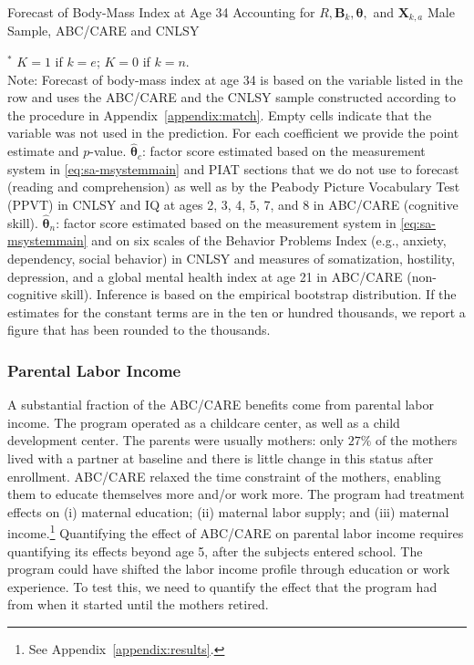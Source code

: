 \begin{table}
\begin{threeparttable}
\caption{Forecast of Body-Mass Index at Age 34 Accounting for $R, \bm{B}_k, \bm{\theta},$ and $\bm{X}_{k,a}$ Male Sample, ABC/CARE and CNLSY}
\label{table:invfin}
\centering
\scriptsize

\begin{tablenotes}
\footnotesize
\item $^\ast$ $K=1$ if $k=e$; $K=0$ if $k=n$.\\
Note: Forecast of body-mass index at age 34 is based on the variable listed in the row and uses the ABC/CARE and the CNLSY sample constructed according to the procedure in Appendix~\ref{appendix:match}. Empty cells indicate that the variable was not used in the prediction. For each coefficient we provide the point estimate and $p$-value. $\hat{\bm{\theta}}_{c}$: factor score estimated based on the measurement system in \eqref{eq:sa-msystemmain} and PIAT sections that we do not use to forecast (reading and comprehension) as well as by the Peabody Picture Vocabulary Test (PPVT) in CNLSY and IQ at ages 2, 3, 4, 5, 7, and 8 in ABC/CARE (cognitive skill). $\hat{\bm{\theta}}_{n}$: factor score estimated based on the measurement system in \eqref{eq:sa-msystemmain} and on six scales of the Behavior Problems Index (e.g., anxiety, dependency, social behavior) in CNLSY and measures of somatization, hostility, depression, and a global mental health index at age 21 in ABC/CARE (non-cognitive skill). Inference is based on the empirical bootstrap distribution. If the estimates for the constant terms are in the ten or hundred thousands, we report a figure that has been rounded to the thousands.
\end{tablenotes}
\end{threeparttable}
\end{table}

\subsubsection{Parental Labor Income}\label{app:parentalincome}

\noindent A substantial fraction of the ABC/CARE benefits come from parental labor income. The program operated as a childcare center, as well as a child development center. The parents were usually mothers: only $27\%$ of the mothers lived with a partner at baseline and there is little change in this status after enrollment. ABC/CARE relaxed the time constraint of the mothers, enabling them to educate themselves more and/or work more. The program had treatment effects on (i) maternal education; (ii) maternal labor supply; and (iii) maternal income.\footnote{See Appendix~\ref{appendix:results}.} Quantifying the effect of ABC/CARE on parental labor income requires quantifying its effects beyond age 5, after the subjects entered school. The program could have shifted the labor income profile through education or work experience. To test this, we need to quantify the effect that the program had from when it started until the mothers retired.


